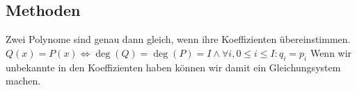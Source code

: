 \subsection{Methoden}
    Zwei Polynome sind genau dann gleich, wenn ihre Koeffizienten
    übereinstimmen.
    $Q(x) = P(x) \iff \deg(Q)=\deg(P)=I \land \forall i, 0 \leq i \leq I: q_i = p_i$
    Wenn wir unbekannte in den Koeffizienten haben können wir damit ein
    Gleichungsystem machen.
